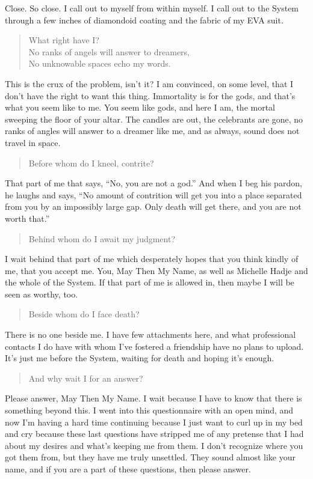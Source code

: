 \noindent Close. So close. I call out to myself from within myself. I call out to the System through a few inches of diamondoid coating and the fabric of my EVA suit.

\begin{quote}
What right have I?\\
No ranks of angels will answer to dreamers,\\
No unknowable spaces echo my words.
\end{quote}

\noindent This is the crux of the problem, isn't it? I am convinced, on some level, that I don't have the right to want this thing. Immortality is for the gods, and that's what you seem like to me. You seem like gods, and here I am, the mortal sweeping the floor of your altar. The candles are out, the celebrants are gone, no ranks of angles will answer to a dreamer like me, and as always, sound does not travel in space.

\begin{quote}
Before whom do I kneel, contrite?
\end{quote}

\noindent That part of me that says, ``No, you are not a god.'' And when I beg his pardon, he laughs and says, ``No amount of contrition will get you into a place separated from you by an impossibly large gap. Only death will get there, and you are not worth that.''

\begin{quote}
Behind whom do I await my judgment?
\end{quote}

\noindent I wait behind that part of me which desperately hopes that you think kindly of me, that you accept me. You, May Then My Name, as well as Michelle Hadje and the whole of the System. If that part of me is allowed in, then maybe I will be seen as worthy, too.

\begin{quote}
Beside whom do I face death?
\end{quote}

\noindent There is no one beside me. I have few attachments here, and what professional contacts I do have with whom I've fostered a friendship have no plans to upload. It's just me before the System, waiting for death and hoping it's enough.

\begin{quote}
And why wait I for an answer?
\end{quote}

\noindent Please answer, May Then My Name. I wait because I have to know that there is something beyond this. I went into this questionnaire with an open mind, and now I'm having a hard time continuing because I just want to curl up in my bed and cry because these last questions have stripped me of any pretense that I had about my desires and what's keeping me from them. I don't recognize where you got them from, but they have me truly unsettled. They sound almost like your name, and if you are a part of these questions, then please answer.

